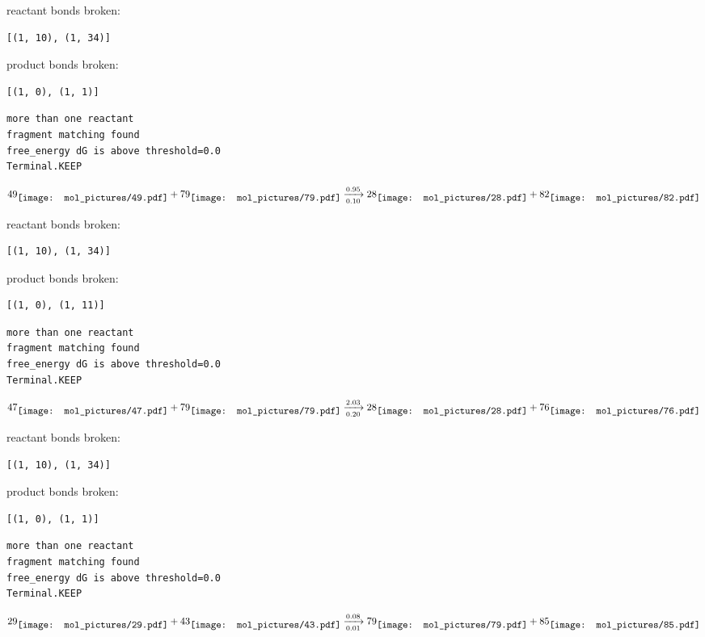 \documentclass{article}
\begin{document}
reactant bonds broken:\begin{verbatim}
[(1, 10), (1, 34)]
\end{verbatim}
product bonds broken:\begin{verbatim}
[(1, 0), (1, 1)]
\end{verbatim}




\vspace{1cm}
\begin{verbatim}
more than one reactant
fragment matching found
free_energy dG is above threshold=0.0
Terminal.KEEP
\end{verbatim}
$$
49
\raisebox{-.5\height}{\texttt{[image: mol\_pictures/49.pdf]}}
+
79
\raisebox{-.5\height}{\texttt{[image: mol\_pictures/79.pdf]}}
\xrightarrow[0.10]{0.95}
28
\raisebox{-.5\height}{\texttt{[image: mol\_pictures/28.pdf]}}
+
82
\raisebox{-.5\height}{\texttt{[image: mol\_pictures/82.pdf]}}
$$


reactant bonds broken:\begin{verbatim}
[(1, 10), (1, 34)]
\end{verbatim}
product bonds broken:\begin{verbatim}
[(1, 0), (1, 11)]
\end{verbatim}




\vspace{1cm}
\begin{verbatim}
more than one reactant
fragment matching found
free_energy dG is above threshold=0.0
Terminal.KEEP
\end{verbatim}
$$
47
\raisebox{-.5\height}{\texttt{[image: mol\_pictures/47.pdf]}}
+
79
\raisebox{-.5\height}{\texttt{[image: mol\_pictures/79.pdf]}}
\xrightarrow[0.20]{2.03}
28
\raisebox{-.5\height}{\texttt{[image: mol\_pictures/28.pdf]}}
+
76
\raisebox{-.5\height}{\texttt{[image: mol\_pictures/76.pdf]}}
$$


reactant bonds broken:\begin{verbatim}
[(1, 10), (1, 34)]
\end{verbatim}
product bonds broken:\begin{verbatim}
[(1, 0), (1, 1)]
\end{verbatim}




\vspace{1cm}
\begin{verbatim}
more than one reactant
fragment matching found
free_energy dG is above threshold=0.0
Terminal.KEEP
\end{verbatim}
$$
29
\raisebox{-.5\height}{\texttt{[image: mol\_pictures/29.pdf]}}
+
43
\raisebox{-.5\height}{\texttt{[image: mol\_pictures/43.pdf]}}
\xrightarrow[0.01]{0.08}
79
\raisebox{-.5\height}{\texttt{[image: mol\_pictures/79.pdf]}}
+
85
\raisebox{-.5\height}{\texttt{[image: mol\_pictures/85.pdf]}}
$$
\end{document}
